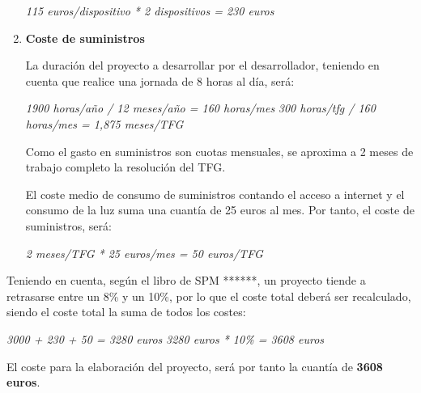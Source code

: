 \begin{enumerate}
\begin{center}
    \textit{115 euros/dispositivo * 2 dispositivos = 230 euros}
\end{center}

    \item \textbf{Coste de suministros}
    
    La duración del proyecto a desarrollar por el desarrollador, teniendo en cuenta que realice una jornada de 8 horas al día, será:
    
\begin{center}
    \textit{1900 horas/año / 12 meses/año = 160 horas/mes}
    \textit{300 horas/tfg / 160 horas/mes = 1,875 meses/TFG}
\end{center}

    Como el gasto en suministros son cuotas mensuales, se aproxima a 2 meses de trabajo completo la resolución del TFG.
    
    El coste medio de consumo de suministros contando el acceso a internet y el consumo de la luz suma una cuantía de 25 euros al mes. Por tanto, el coste de suministros, será:
\begin{center}
    \textit{2 meses/TFG * 25 euros/mes = 50 euros/TFG}
\end{center}
    
\end{enumerate}

Teniendo en cuenta, según el libro de SPM ******, un proyecto tiende a retrasarse entre un 8\% y un 10\%, por lo que el coste total deberá ser recalculado, siendo el coste total la suma de todos los costes:

\begin{center}
    \textit{3000 + 230 + 50 = 3280 euros}
    \textit{3280 euros * 10\%  = 3608 euros}
\end{center}

El coste para la elaboración del proyecto, será por tanto la cuantía de \textbf{3608 euros}.